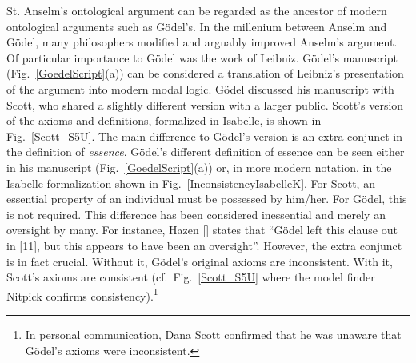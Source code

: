 \documentclass{article}
\begin{document}
St. Anselm's ontological argument \cite{Proslogion} can be regarded as
the ancestor of modern ontological arguments such as G\"odel's. In the
millenium between Anselm and G\"odel, many philosophers modified and
arguably improved Anselm's argument. Of particular importance to
G\"odel was the work of Leibniz. 
G\"odel's manuscript
(Fig.~\ref{GoedelScript}(a)) can be considered a translation of Leibniz's
presentation of the argument into modern modal logic. G\"odel
discussed his manuscript with Scott, who shared a slightly different
version with a larger public. Scott's version of the axioms and
definitions, formalized in Isabelle, is shown in
Fig.~\ref{Scott_S5U}. The main difference to G\"odel's version is an extra conjunct in the definition of \emph{essence}. G\"odel's
different definition of essence can be seen either in his manuscript
(Fig.~\ref{GoedelScript}(a)) or, in more modern notation, in the Isabelle
formalization shown in Fig.~\ref{InconsistencyIsabelleK}. For Scott,
an essential property of an individual must be possessed by
him/her. For G\"odel, this is not required. This difference has been
considered inessential and merely an oversight by many. For instance,
Hazen [\citeyear[p.365]{Hazen}] states that ``G\"odel left this
clause out in [11], but this appears to have been an oversight''.
However, the extra conjunct is in
fact crucial. Without it, G\"odel's original axioms are
inconsistent. With it, Scott's axioms are consistent (cf.~Fig.~\ref{Scott_S5U}
where the model finder Nitpick \cite{Nitpick} confirms consistency).\footnote{In
  personal communication, Dana Scott confirmed that he was unaware
  that G\"odel's axioms were inconsistent.}


\end{document}
